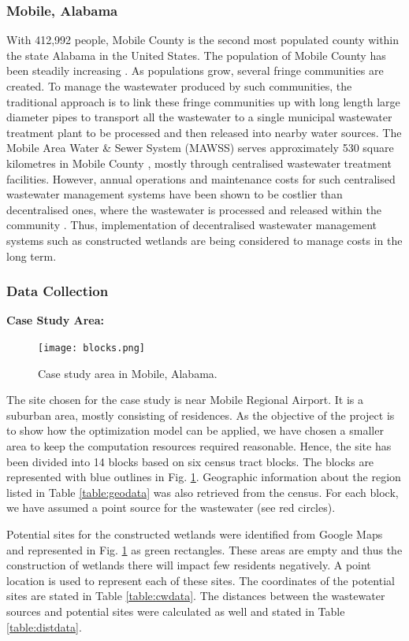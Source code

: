 \documentclass[preprint,12pt,authoryear]{elsarticle}
\begin{document}
\subsubsection{Mobile, Alabama}
With 412,992 people, Mobile County is the second most populated county within the state Alabama in the United States. The population of Mobile County has been steadily increasing \citep{uscb2002census}. As populations grow, several fringe communities are created. To manage the wastewater produced by such communities, the traditional approach is to link these fringe communities up with long length large diameter pipes to transport all the wastewater to a single municipal wastewater treatment plant to be processed and then released into nearby water sources. The Mobile Area Water \& Sewer System (MAWSS) serves approximately 530 square kilometres in Mobile County \citep{mawss2015}, mostly through centralised wastewater treatment facilities. However, annual operations and maintenance costs for such centralised wastewater management systems have been shown to be costlier than decentralised ones, where the wastewater is processed and released within the community \citep{mawss2015}. Thus, implementation of decentralised wastewater management systems such as constructed wetlands are being considered to manage costs in the long term. 

\subsubsection{Data Collection}
\textbf{Case Study Area:}\begin{figure}[!b]
	\centering
	\texttt{[image: blocks.png]}
	\caption{Case study area in Mobile, Alabama.}
	\label{fig:blocks}
\end{figure}
The site chosen for the case study is near Mobile Regional Airport. It is a suburban area, mostly consisting of residences. As the objective of the project is to show how the optimization model can be applied, we have chosen a smaller area to keep the computation resources required reasonable. Hence, the site has been divided into 14 blocks based on six census tract blocks. The blocks are represented with blue outlines in Fig. \ref{fig:blocks}. Geographic information about the region listed in Table \ref{table:geodata} was also retrieved from the census. \citep{acs2015} For each block, we have assumed a point source for the wastewater (see red circles).

Potential sites for the constructed wetlands were identified from Google Maps and represented in Fig. \ref{fig:blocks} as green rectangles. These areas are empty and thus the construction of wetlands there will impact few residents negatively. A point location is used to represent each of these sites. The coordinates of the potential sites are stated in Table \ref{table:cwdata}. The distances between the wastewater sources and potential sites were calculated as well and stated in Table \ref{table:distdata}. 
\end{document}
